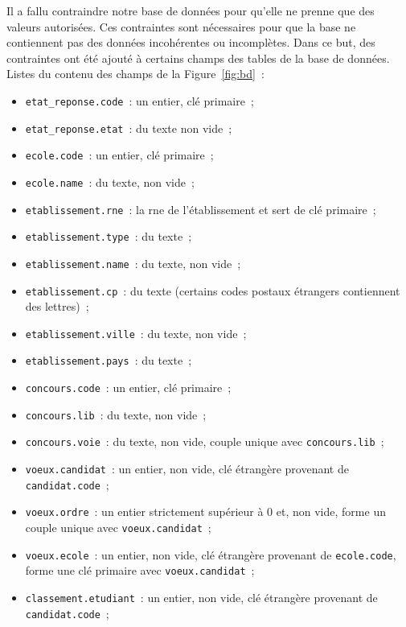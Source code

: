 \documentclass[12pt]{article}
\begin{document}
        Il a fallu contraindre notre base de données pour qu'elle ne prenne que des valeurs autorisées. Ces contraintes sont nécessaires pour que la base ne contiennent pas des données incohérentes ou incomplètes. Dans ce but, des contraintes ont été ajouté à certains champs des tables de la base de données. Listes du contenu des champs de la Figure~\ref{fig:bd}~:
        \begin{itemize}[label=\textbullet]
            \item \texttt{etat\_reponse.code}~: un entier, clé primaire~;
            \item \texttt{etat\_reponse.etat}~: du texte non vide~;
            \item \texttt{ecole.code}~: un entier, clé primaire~;
            \item \texttt{ecole.name}~: du texte, non vide~;
            \item \texttt{etablissement.rne}~: la rne de l'établissement et sert de clé primaire~;
            \item \texttt{etablissement.type}~: du texte~;
            \item \texttt{etablissement.name}~: du texte, non vide~;
            \item \texttt{etablissement.cp}~: du texte (certains codes postaux étrangers contiennent des lettres)~;
            \item \texttt{etablissement.ville}~: du texte, non vide~;
            \item \texttt{etablissement.pays}~: du texte~;
            \item \texttt{concours.code}~: un entier, clé primaire~;
            \item \texttt{concours.lib}~: du texte, non vide~;
            \item \texttt{concours.voie}~: du texte, non vide, couple unique avec \texttt{concours.lib}~;
            \item \texttt{voeux.candidat}~: un entier, non vide, clé étrangère provenant de \texttt{candidat.code}~;
            \item \texttt{voeux.ordre}~: un entier strictement supérieur à 0 et, non vide, forme un couple unique avec \texttt{voeux.candidat}~;
            \item \texttt{voeux.ecole}~: un entier, non vide, clé étrangère provenant de \texttt{ecole.code}, forme une clé primaire avec \texttt{voeux.candidat}~;
            \item \texttt{classement.etudiant}~: un entier, non vide, clé étrangère provenant de \texttt{candidat.code}~;

\end{itemize}
\end{document}
